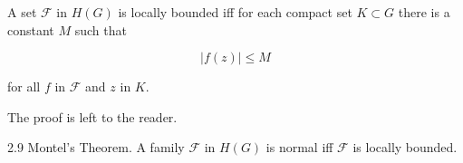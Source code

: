 A set $\mathcal{F}$ in $H(G)$ is locally bounded iff for each compact set $K \subset G$ there is a constant $M$ such that

$$|f(z)| \leq M$$

for all $f$ in $\mathcal{F}$ and $z$ in $K$.

The proof is left to the reader.

2.9 Montel’s Theorem. A family $\mathcal{F}$ in $H(G)$ is normal iff $\mathcal{F}$ is locally bounded.